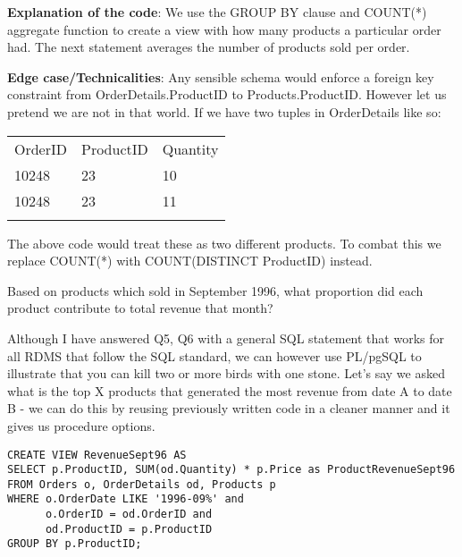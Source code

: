 \documentclass[11pt]{exam}
\newcommand{\headcol}{\rowcolor{tableheadcolor}} %
\newcommand{\topline}{\arrayrulecolor{black}\specialrule{0.1em}{\abovetopsep}{0pt}%
            \arrayrulecolor{tableheadcolor}\specialrule{\belowrulesep}{0pt}{0pt}%
            \arrayrulecolor{black}}
\newcommand{\midline}{\arrayrulecolor{tableheadcolor}\specialrule{\aboverulesep}{0pt}{0pt}%
            \arrayrulecolor{black}\specialrule{\lightrulewidth}{0pt}{0pt}%
            \arrayrulecolor{white}\specialrule{\belowrulesep}{0pt}{0pt}%
            \arrayrulecolor{black}}
\newcommand{\bottomlinec}{\arrayrulecolor{tablerowcolor}\specialrule{\aboverulesep}{0pt}{0pt}%
            \arrayrulecolor{black}\specialrule{\heavyrulewidth}{0pt}{\belowbottomsep}}%
\begin{document}
\begin{questions}
\begin{solution}
{{\bfseries Explanation of the code}:  We use the GROUP BY clause and COUNT(*) aggregate function to create a view with how many products a particular order had. The next statement averages the number of products sold per order.

{\bfseries Edge case/Technicalities}: Any sensible schema would enforce a foreign key constraint from OrderDetails.ProductID to Products.ProductID. However let us pretend we are not in that world. If we have two tuples in OrderDetails like so:}

{\selectfont
\begin{center}
\renewcommand{\arraystretch}{1.5}
\begin{tabular}{p{4cm} p{2cm} p{2cm}}
  \topline
  \headcol OrderID & ProductID & Quantity\\
  \midline
    10248 & 23 & 10\\
    10248 & 23 & 11\\
  \bottomlinec
\end{tabular}
\end{center}
}


{\selectfont The above code would treat these as two different products. To combat this we replace COUNT(*) with COUNT(DISTINCT ProductID) instead.}
\end{solution}

\question
{\selectfont Based on products which sold in September 1996, what proportion did each product contribute to total revenue that month?}

\begin{solution}

{\selectfont Although I have answered Q5, Q6 with a general SQL statement that works for all RDMS that follow the SQL standard, we can however use PL/pgSQL to illustrate that you can kill two or more birds with one stone. Let's say we asked what is the top X products that generated the most revenue from date A to date B - we can do this by reusing previously written code in a cleaner manner and it gives us procedure options.}

\begin{myfont}
\begin{lstlisting}
CREATE VIEW RevenueSept96 AS
SELECT p.ProductID, SUM(od.Quantity) * p.Price as ProductRevenueSept96
FROM Orders o, OrderDetails od, Products p
WHERE o.OrderDate LIKE '1996-09%' and
      o.OrderID = od.OrderID and
      od.ProductID = p.ProductID
GROUP BY p.ProductID;


\end{lstlisting}
\end{myfont}
\end{solution}
\end{questions}
\end{document}
